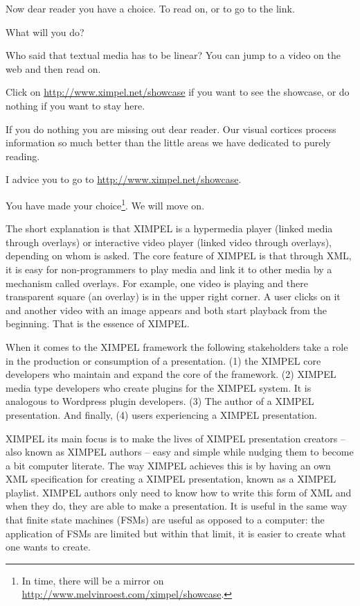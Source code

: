 Now dear reader you have a choice. To read on, or to go to the link.

What will you do?

Who said that textual media has to be linear? You can jump to a video on the web and then read on.

Click on \href{ximpel.net/showcase}{http://www.ximpel.net/showcase} if you want to see the showcase, or do nothing if you want to stay here.

If you do nothing you are missing out dear reader. Our visual cortices process information so much better than the little areas we have dedicated to purely reading.

I advice you to go to \href{ximpel.net/showcase}{http://www.ximpel.net/showcase}.

You have made your choice\footnote{In time, there will be a mirror on \href{melvinroest.com/ximpel/showcase}{http://www.melvinroest.com/ximpel/showcase}.}. We will move on.

The short explanation is that XIMPEL is a hypermedia player (linked media through overlays) or interactive video player (linked video through overlays), depending on whom is asked. The core feature of XIMPEL is that through XML, it is easy for non-programmers to play media and link it to other media by a mechanism called overlays. For example, one video is playing and there transparent square (an overlay) is in the upper right corner. A user clicks on it and another video with an image appears and both start playback from the beginning. That is the essence of XIMPEL.

When it comes to the XIMPEL framework the following stakeholders take a role in the production or consumption of a presentation. (1) the XIMPEL core developers who maintain and expand the core of the framework. (2) XIMPEL media type developers who create plugins for the XIMPEL system. It is analogous to Wordpress plugin developers. (3) The author of a XIMPEL presentation. And finally, (4) users experiencing a XIMPEL presentation.

XIMPEL its main focus is to make the lives of XIMPEL presentation creators -- also known as XIMPEL authors -- easy and simple while nudging them to become a bit computer literate. The way XIMPEL achieves this is by having an own XML specification for creating a XIMPEL presentation, known as a XIMPEL playlist. XIMPEL authors only need to know how to write this form of XML and when they do, they are able to make a presentation. It is useful in the same way that finite state machines (FSMs) are useful as opposed to a computer: the application of FSMs are limited but within that limit, it is easier to create what one wants to create.

